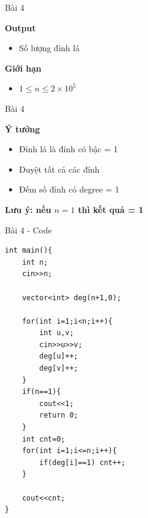 \begin{frame}{Bài 4}

\textbf{Output}
\begin{itemize}
\item Số lượng đỉnh lá
\end{itemize}

\vspace{0.3cm}

\textbf{Giới hạn}
\begin{itemize}
\item $1 \le n \le 2 \times 10^5$
\end{itemize}

\end{frame}

\begin{frame}{Bài 4}

\textbf{Ý tưởng}

\vspace{0.4cm}

\begin{itemize}
\item Đỉnh lá là đỉnh có bậc = 1
\item Duyệt tất cả các đỉnh
\item Đếm số đỉnh có degree = 1
\end{itemize}

\vspace{0.3cm}

\textbf{Lưu ý: nếu $n=1$ thì kết quả = 1}

\end{frame}

\begin{frame}[fragile]{Bài 4 - Code}

\begin{lstlisting}
int main(){
    int n;
    cin>>n;

    vector<int> deg(n+1,0);

    for(int i=1;i<n;i++){
        int u,v;
        cin>>u>>v;
        deg[u]++;
        deg[v]++;
    }
    if(n==1){
        cout<<1;
        return 0;
    }
    int cnt=0;
    for(int i=1;i<=n;i++){
        if(deg[i]==1) cnt++;
    }

    cout<<cnt;
}
\end{lstlisting}

\end{frame}